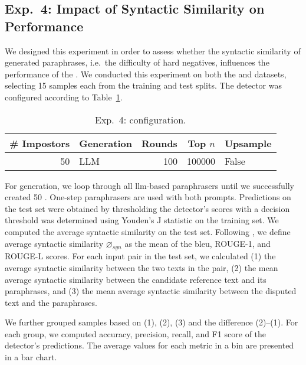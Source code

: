 \subsection{Exp.\ 4: Impact of Syntactic Similarity on \impApprTitle{} Performance}
\label{sec:syn_sim_impact_}

We designed this experiment in order to assess whether the syntactic similarity of generated paraphrases, i.e.\ the difficulty of hard negatives, influences the performance of the \impAppr{}.
We conducted this experiment on both the \dataBlog{} and \dataStudent{} datasets, selecting 15 samples each from the training and test splits. 
The detector was configured according to Table~\ref{tab:imp_syn_sim_config}.

\begin{table}[h]
\centering\small
\caption{Exp.\ 4: \impAppr{} configuration.}
\label{tab:imp_syn_sim_config}
\begin{tabular}{@{}rlrrl@{}}   %
\toprule
\# Impostors & Generation & Rounds & Top $n$ & Upsample \\
\midrule
50 & LLM & 100 & \num{100000} & False \\
\bottomrule
\end{tabular}%
\end{table}

For generation, we loop through all \ac{llm}-based paraphrasers until we successfully created 50 \imps{}.
One-step paraphrasers are used with both prompts.
Predictions on the test set were obtained by thresholding the detector’s scores with a decision threshold was determined using Youden’s J statistic on the training set.
We computed the average syntactic similarity on the test set. 
Following \citet{gohsen_captions_2023}, we define average syntactic similarity $\diameter_{syn}$ as the mean of the \ac{bleu}, ROUGE-1, and ROUGE-L scores. 
For each input pair in the test set, we calculated
(1) the average syntactic similarity between the two texts in the pair, (2) the mean average syntactic similarity between the candidate reference text and its paraphrases, and (3) the mean average syntactic similarity between the disputed text and the paraphrases.

We further grouped samples based on (1), (2), (3) and the difference (2)–(1). 
For each group, we computed accuracy, precision, recall, and F1 score of the detector’s predictions. 
The average values for each metric in a bin are presented in a bar chart.

